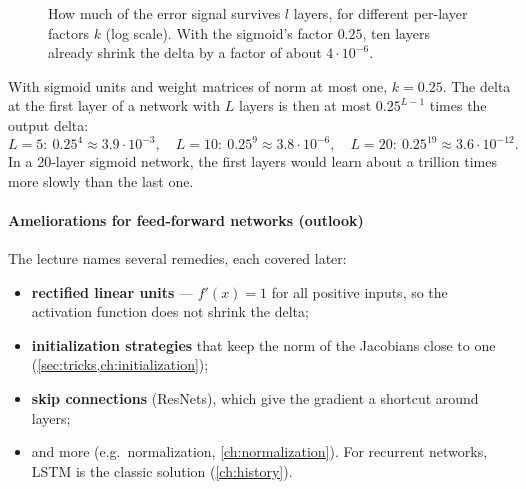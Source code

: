 \documentclass[11pt, oneside]{book}
\newcommand{\norm}[1]{\left\lVert #1 \right\rVert}
\begin{document}
\begin{figure}[htbp]
\centering
{}
\caption{How much of the error signal survives $l$ layers, for different
per-layer factors $k$ (log scale). With the sigmoid's factor $0.25$, ten
layers already shrink the delta by a factor of about $4\cdot 10^{-6}$.}
\label{fig:vgp}
\end{figure}

\begin{exbox}[title={How fast do gradients vanish?}]
With sigmoid units and weight matrices of norm at most one, $k = 0.25$. The
delta at the first layer of a network with $L$ layers is then at most
$0.25^{L-1}$ times the output delta:
\[
  L = 5:\ 0.25^4 \approx 3.9\cdot 10^{-3}, \quad
  L = 10:\ 0.25^9 \approx 3.8\cdot 10^{-6}, \quad
  L = 20:\ 0.25^{19} \approx 3.6\cdot 10^{-12}.
\]
In a 20-layer sigmoid network, the first layers would learn about a
trillion times more slowly than the last one.
\end{exbox}

\paragraph{Ameliorations for feed-forward networks (outlook)}
The lecture names several remedies, each covered later:
\begin{itemize}
  \item \textbf{rectified linear units} --- $f'(x) = 1$ for all positive
    inputs, so the activation function does not shrink the delta;
  \item \textbf{initialization strategies} that keep the norm of the
    Jacobians close to one (\cref{sec:tricks,ch:initialization});
  \item \textbf{skip connections} (ResNets), which give the gradient a
    shortcut around layers;
  \item and more (e.g.\ normalization, \cref{ch:normalization}). For
    recurrent networks, LSTM is the classic solution (\cref{ch:history}).
\end{itemize}
\end{document}

